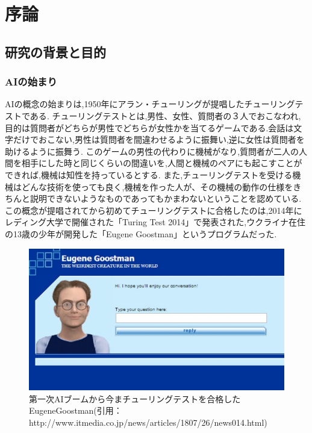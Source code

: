 \chapter{序論}
\section{研究の背景と目的}
\subsection{AIの始まり}
AIの概念の始まりは,1950年にアラン・チューリングが提唱したチューリングテストである\cite{ronbun}.
チューリングテストとは,男性、女性、質問者の３人でおこなわれ,目的は質問者がどちらが男性でどちらが女性かを当てるゲームである.会話は文字だけでおこない,男性は質問者を間違わせるように振舞い,逆に女性は質問者を助けるように振舞う.
このゲームの男性の代わりに機械がなり,質問者が二人の人間を相手にした時と同じくらいの間違いを,人間と機械のペアにも起こすことができれば,機械は知性を持っているとする.
また,チューリングテストを受ける機械はどんな技術を使っても良く,機械を作った人が、その機械の動作の仕様をきちんと説明できないようなものであってもかまわないということを認めている.
この概念が提唱されてから初めてチューリングテストに合格したのは,2014年にレディング大学で開催された「Turing Test 2014」で発表された,ウクライナ在住の13歳の少年が開発した「Eugene Goostman」というプログラムだった.
\begin{figure}[!ht]
    \begin{screen}
    \begin{center}
        \includegraphics[scale=0.6, clip]{./img/Eugene_Goostman.jpg}
        \caption{第一次AIブームから今まチューリングテストを合格したEugeneGoostman\newline(引用：http://www.itmedia.co.jp/news/articles/1807/26/news014.html)}
        \label{fig:チューリングテストを合格したEugeneGoostman}
    \end{center}
\end{screen}
\end{figure}
